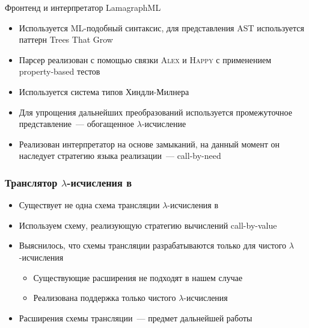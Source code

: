 \documentclass
  [ russian
  , aspectratio=169 %
  ] {beamer}
\begin{document}
\begin{frame}{Фронтенд и интерпретатор LamagraphML}

    \begin{itemize}
        \item Используется ML-подобный синтаксис, для представления AST используется паттерн Trees That Grow
        \item Парсер реализован с помощью связки \textsc{Alex} и \textsc{Happy} с применением property-based тестов
        \item Используется система типов Хиндли-Милнера
        \item Для упрощения дальнейших преобразований используется промежуточное представление~--- обогащенное $\lambda$-исчисление
        \item Реализован интерпретатор на основе замыканий, на данный момент он наследует стратегию языка реализации~--- call-by-need
    \end{itemize}

\end{frame}

\begin{frame}
    \frametitle{Транслятор $\lambda$-исчисления в \INs{}}

    \begin{itemize}
        \item Существует не одна схема трансляции $\lambda$-исчисления в \INs{}
        \item Используем схему, реализующую стратегию вычислений call-by-value
        \item Выяснилось, что схемы трансляции разрабатываются только для чистого $\lambda$-исчисления
              \begin{itemize}
                  \item Существующие расширения не подходят в нашем случае
                  \item Реализована поддержка только чистого $\lambda$-исчисления
              \end{itemize}
        \item Расширения схемы трансляции~--- предмет дальнейшей работы
    \end{itemize}

\end{frame}
\end{document}

